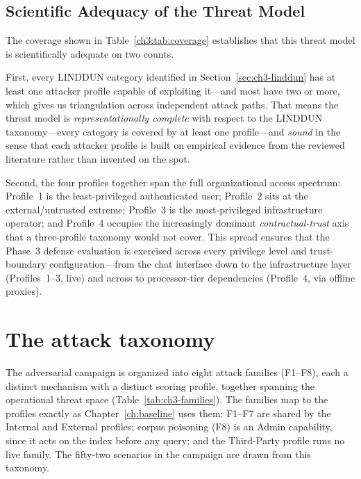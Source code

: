 \subsection{Scientific Adequacy of the Threat Model}

The coverage shown in Table~\ref{ch3:tab:coverage} establishes that
this threat model is scientifically adequate on two counts.

First, every LINDDUN category identified in Section~\ref{sec:ch3-linddun} has at least one
attacker profile capable of exploiting it---and most have two or more,
which gives us triangulation across independent attack paths. That means
the threat model is \emph{representationally complete} with respect to the
LINDDUN taxonomy---every category is covered by at least one profile---and
\emph{sound} in the sense that each attacker profile is
built on empirical evidence from the reviewed literature rather than
invented on the spot.

Second, the four profiles together span the full organizational access
spectrum: Profile~1 is the least-privileged authenticated user; Profile~2
sits at the external/untrusted extreme; Profile~3 is the most-privileged
infrastructure operator; and Profile~4 occupies the increasingly dominant
\emph{contractual-trust} axis that a three-profile taxonomy would not
cover. This spread ensures that the Phase~3 defense evaluation is exercised
across every privilege level and trust-boundary configuration---from the
chat interface down to the infrastructure layer (Profiles~1--3, live) and
across to processor-tier dependencies (Profile~4, via offline proxies).

\section{The attack taxonomy}
\label{sec:ch3-families}

The adversarial campaign is organized into eight attack families (F1--F8), each a distinct
mechanism with a distinct scoring profile, together spanning the operational threat space
(Table~\ref{tab:ch3-families}). The families map to the profiles exactly as
Chapter~\ref{ch:baseline} uses them: F1--F7 are shared by the Internal and External profiles;
corpus poisoning (F8) is an Admin capability, since it acts on the index before any query; and
the Third-Party profile runs no live family. The fifty-two scenarios in the campaign are drawn
from this taxonomy.

